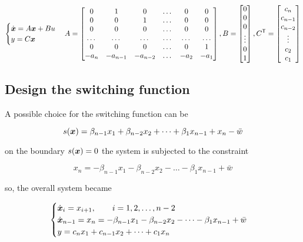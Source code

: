 \[
    \begin{cases}
        \dx = A \x + B u \\
        y = C \x
    \end{cases} \\

    A = \begin{bmatrix}
            0 & 1 & 0 & \dots & 0 & 0 \\
            0 & 0 & 1 & \dots & 0 & 0 \\
            0 & 0 & 0 & \dots & 0 & 0 \\
            \dots & \dots & \dots & \dots & \dots & \dots \\
            0 & 0 & 0 & \dots & 0 & 1 \\
            -a_n & -a_{n-1} & -a_{n-2} & \dots & -a_2 & -a_1
    \end{bmatrix},
    B = \begin{bmatrix} 0 \\ 0 \\ 0 \\ \vdots \\ 0 \\ 1 \end{bmatrix},
    C^{\trans} = \begin{bmatrix} c_n \\ c_{n-1} \\ c_{n-2} \\ \vdots \\ c_2 \\ c_1 \end{bmatrix}
\]

\subsection{Design the switching function}

A possible choice for the switching function can be

\[
    s(\boldsymbol{x}) = \beta_{n-1} x_1 + \beta_{n-2} x_2 + \dots + \beta_1 x_{n-1} + x_n - \bar w
\]

on the boundary $s(\boldsymbol{x})=0$ the system is subjected to the constraint

\[
    x_n = - \beta_{n-1} x_1 - \beta_{n-2} x_2 - \dots - \beta_1 x_{n-1} + \bar w
\]

so, the overall system became

\[
    \begin{cases}
        \dot{\boldsymbol{x}}_i = x_{i+1}, \qquad i = 1,2,\dots, n-2 \\
        \dot{\boldsymbol{x}}_{n-1} = x_n = - \beta_{n-1} x_1 - \beta_{n-2} x_2 - \dots - \beta_1 x_{n-1} + \bar w \\
        y = c_n x_1 + c_{n-1} x_2 + \dots + c_1 x_n
    \end{cases}
\]

